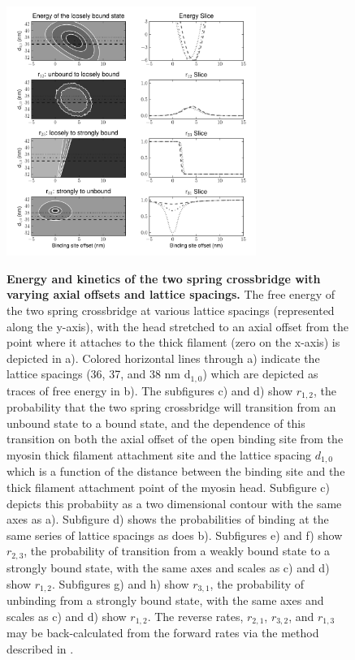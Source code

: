 \documentclass[]{article}
\begin{document}
\begin{figure}[p]
    \begin{center}
    \includegraphics[width=3.2in]{../imgs/Figure2.pdf}
    \label{fig:2s}
    \caption{
        \textbf{Energy and kinetics of the two spring crossbridge with varying axial offsets and lattice spacings.} 
        The free energy of the two spring crossbridge at various lattice spacings (represented along the y-axis), with the head stretched to an axial offset from the point where it attaches to the thick filament (zero on the x-axis) is depicted in a). Colored horizontal lines through a) indicate the lattice spacings (36, 37, and 38 nm d$_{1,0}$) which are depicted as traces of free energy in b).
        The subfigures c) and d) show $r_{1,2}$, the probability that the two spring crossbridge will transition from an unbound state to a bound state, and the dependence of this transition on both the axial offset of the open binding site from the myosin thick filament attachment site and the lattice spacing $d_{1,0}$ which is a function of the distance between the binding site and the thick filament attachment point of the myosin head. Subfigure c) depicts this probabiity as a two dimensional contour with the same axes as a). Subfigure d) shows the probabilities of binding at the same series of lattice spacings as does b).
        Subfigures e) and f) show $r_{2,3}$, the probability of transition from a weakly bound state to a strongly bound state, with the same axes and scales as c) and d) show $r_{1,2}$.
        Subfigures g) and h) show $r_{3,1}$, the probability of unbinding from a strongly bound state, with the same axes and scales as c) and d) show $r_{1,2}$.
        The reverse rates, $r_{2,1}$, $r_{3,2}$, and $r_{1,3}$ may be back-calculated from the forward rates via the method described in \cite{Tanner2007a}.
    }
    \end{center}
\end{figure}
\end{document}
